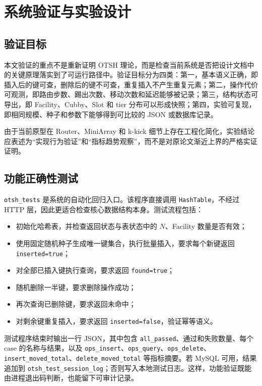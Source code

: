 \chapter{系统验证与实验设计}
\label{ch:exp}

\section{验证目标}
本文验证的重点不是重新证明 OTSH 理论，而是检查当前系统是否把设计文档中的关键原理落实到了可运行路径中。验证目标分为四类：第一，基本语义正确，即插入后的键可查，删除后的键不可查，重复插入不产生重复元素；第二，操作代价可观测，即路由步数、踢出次数、移动次数和延迟能够被记录；第三，结构状态可导出，即 Facility、Cubby、Slot 和 tier 分布可以形成快照；第四，实验可复现，即相同规模、种子和参数下能够得到可比较的 JSON 或数据库记录。

由于当前原型在 Router、MiniArray 和 k-kick 细节上存在工程化简化，实验结论应表述为“实现行为验证”和“指标趋势观察”，而不是对原论文渐近上界的严格实证证明。

\section{功能正确性测试}
\texttt{otsh\_tests} 是系统的自动化回归入口。该程序直接调用 \texttt{HashTable}，不经过 HTTP 层，因此更适合检查核心数据结构本身。测试流程包括：
\begin{itemize}
  \item 初始化哈希表，并检查返回状态与表状态中的 \(N\)、Facility 数量是否有效；
  \item 使用固定随机种子生成唯一键集合，执行批量插入，要求每个新键返回 \texttt{inserted=true}；
  \item 对全部已插入键执行查询，要求返回 \texttt{found=true}；
  \item 随机删除一半键，要求删除操作成功；
  \item 再次查询已删除键，要求返回未命中；
  \item 对剩余键重复插入，要求返回 \texttt{inserted=false}，验证幂等语义。
\end{itemize}

测试程序结束时输出一行 JSON，其中包含 \texttt{all\_passed}、通过和失败数量、每个 case 的名称与结果，以及 \texttt{ops\_insert}、\texttt{ops\_query}、\texttt{ops\_delete}、\texttt{insert\_moved\_total}、\texttt{delete\_moved\_total} 等指标摘要。若 MySQL 可用，结果追加到 \texttt{otsh\_test\_session\_log}；否则写入本地测试日志。这样，功能验证既能由进程退出码判断，也能留下可审计记录。

